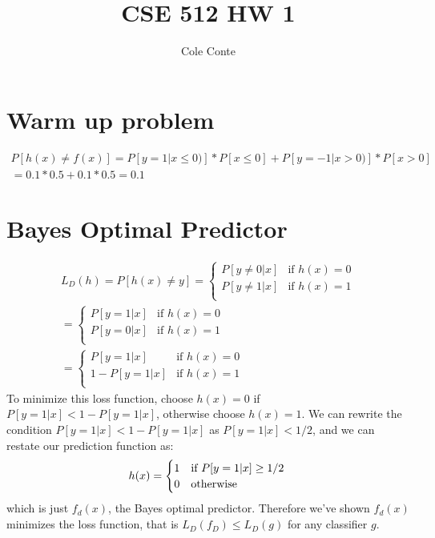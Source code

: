 \documentclass{article}
\begin{document}
\title{CSE 512 HW 1}
\author{Cole Conte}
\date{}

\maketitle

\pagebreak
\section{Warm up problem}
\begin{equation}
\begin{split}
P[h(x) \neq f(x)] = P[y=1 | x \leq 0)]*P[x \leq 0] + P[y=-1 | x > 0)]*P[x > 0] \\
 = 0.1*0.5 + 0.1*0.5 = 0.1
\end{split}
\end{equation}


\section{Bayes Optimal Predictor}
\begin{equation}
\begin{split}
L_D(h) = P[h(x) \neq y] =
 \begin{cases} 
      P[y \neq 0 | x] &\text{if }  h(x)=0 \\
      P[y \neq 1 | x] &\text{if }  h(x)=1 \\
   \end{cases}\\
   = 
    \begin{cases} 
      P[y = 1 | x] & \text{if } h(x)=0 \\
      P[y = 0 | x] &\text{if } h(x)=1 \\
   \end{cases}\\
    =
    \begin{cases} 
      P[y = 1 | x] & \text{if } h(x)=0 \\
      1- P[y = 1 | x] &\text{if } h(x)=1 \\
   \end{cases}
\end{split}
\end{equation}
To minimize this loss function, choose \(h(x)=0\) if \(P[y = 1 | x] < 1-P[y = 1 | x] \), otherwise choose \(h(x)=1\).
We can rewrite the condition \(P[y = 1 | x] < 1- P[y = 1 | x] \) as  \(P[y = 1 | x] < 1/2 \), and we can restate our prediction function as:
\begin{equation}
h(x) =  \begin{cases} 
      1 &\text{if }  P[y = 1 | x] \geq 1/2 \\
      0 &\text{otherwise } \\
   \end{cases}\\
\end{equation}
which is just \(f_d(x)\), the Bayes optimal predictor. Therefore we've shown \(f_d(x)\) minimizes the loss function, that is \(L_D(f_D) \leq L_D(g) \) for any classifier \(g\).
\end{document}
